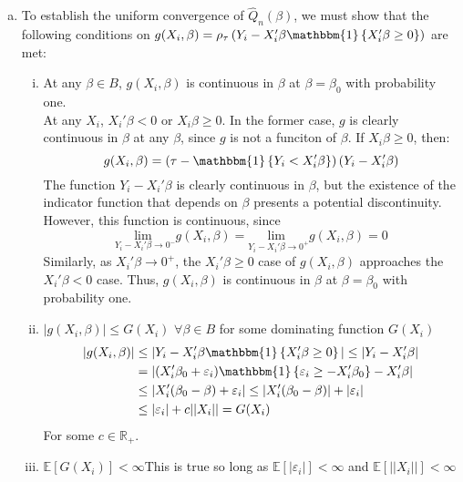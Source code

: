 \documentclass{article}
\newcommand{\R}{\mathbb{R}}
\newcommand{\one}[1]{\mathbbm{1}\left\{#1\right\}}
\newcommand{\Qhat}{\hat{Q}_n(\beta)}
\renewcommand{\lim}[1]{\underset{#1}{\text{lim }}}
\newcommand{\E}[1]{\mathbb{E}\left[#1\right]}%
\begin{document}
\begin{enumerate}[(a)]
    \item To establish the uniform convergence of $\Qhat$, we must show that the following conditions on ${g(X_i, \beta) = \rho_\tau\left(Y_i - X_i'\beta\one{X_i'\beta\geq 0}\right)}$ are met: 
        \begin{enumerate}[(i)]
            \item At any $\beta\in B$, $g(X_i,\beta)$ is continuous in $\beta$ at ${\beta=\beta_0}$ with probability one. \medskip \\
            At any $X_i$, $X_i'\beta<0$ or ${X_i\beta\geq 0}$. In the former case, $g$ is clearly continuous in $\beta$ at any $\beta$, since $g$ is not a funciton of $\beta$. If ${X_i\beta\geq 0}$, then:\[
                g(X_i, \beta) = \left(\tau - \one{Y_i < X_i'\beta}\right)(Y_i - X_i'\beta)
            \]
            The function ${Y_i-X_i'\beta}$ is clearly continuous in $\beta$, but the existence of the indicator function that depends on $\beta$ presents a potential discontinuity. However, this function is continuous, since\[
                \lim{Y_i-X_i'\beta\rightarrow 0^-}g(X_i,\beta) = \lim{Y_i-X_i'\beta\rightarrow 0^+}g(X_i,\beta) = 0
            \]
            Similarly, as ${X_i'\beta\rightarrow 0^+}$, the ${X_i'\beta\geq0}$ case of $g(X_i,\beta)$ approaches the ${X_i'\beta<0}$ case. Thus, $g(X_i,\beta)$ is continuous in $\beta$ at $\beta=\beta_0$ with probability one.
            
            \item ${|g(X_i,\beta)|\leq G(X_i)}$ $\forall \beta\in B$ for some dominating function $G(X_i)$\begin{align*}
                |g(X_i,\beta)|  &\leq |Y_i-X_i'\beta\one{X_i'\beta\geq 0}|\leq |Y_i-X_i'\beta|                     \\
                                &= |(X_i'\beta_0 + \varepsilon_i)\one{\varepsilon_i\geq -X_i'\beta_0} - X_i'\beta| \\
                                &\leq |X_i'(\beta_0-\beta) + \varepsilon_i| \leq |X_i'(\beta_0-\beta)| + |\varepsilon_i|    \\
                                &\leq |\varepsilon_i| + c||X_i|| = G(X_i)
            \end{align*}
            For some $c\in\R_+$.
            
            \item $\E{G(X_i)}<\infty$\textemdash This is true so long as ${\E{|\varepsilon_i|}<\infty}$ and ${\E{||X_i||}<\infty}$
            

\end{enumerate}
\end{enumerate}
\end{document}
